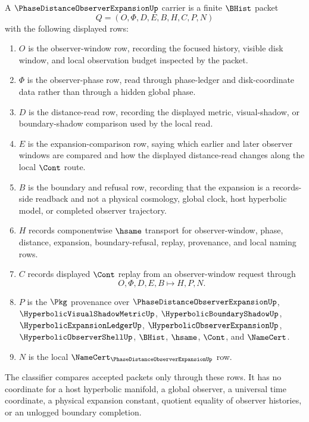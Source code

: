 \begin{definition}
\label{def:phase-distance-observer-expansion-carrier}
A $\PhaseDistanceObserverExpansionUp$ carrier is a finite $\BHist$ packet
$$
Q=(O,\Phi,D,E,B,H,C,P,N)
$$
with the following displayed rows:
\begin{enumerate}
\item $O$ is the observer-window row, recording the focused history, visible disk window, and local observation budget inspected by the packet.
\item $\Phi$ is the observer-phase row, read through phase-ledger and disk-coordinate data rather than through a hidden global phase.
\item $D$ is the distance-read row, recording the displayed metric, visual-shadow, or boundary-shadow comparison used by the local read.
\item $E$ is the expansion-comparison row, saying which earlier and later observer windows are compared and how the displayed distance-read changes along the local $\Cont$ route.
\item $B$ is the boundary and refusal row, recording that the expansion is a records-side readback and not a physical cosmology, global clock, host hyperbolic model, or completed observer trajectory.
\item $H$ records componentwise $\hsame$ transport for observer-window, phase, distance, expansion, boundary-refusal, replay, provenance, and local naming rows.
\item $C$ records displayed $\Cont$ replay from an observer-window request through
$$
O,\Phi,D,E,B \longmapsto H,P,N .
$$
\item $P$ is the $\Pkg$ provenance over $\PhaseDistanceObserverExpansionUp$, $\HyperbolicVisualShadowMetricUp$, $\HyperbolicBoundaryShadowUp$, $\HyperbolicExpansionLedgerUp$, $\HyperbolicObserverExpansionUp$, $\HyperbolicObserverShellUp$, $\BHist$, $\hsame$, $\Cont$, and $\NameCert$.
\item $N$ is the local $\NameCert_{\PhaseDistanceObserverExpansionUp}$ row.
\end{enumerate}
The classifier compares accepted packets only through these rows. It has no coordinate for a host hyperbolic manifold, a global observer, a universal time coordinate, a physical expansion constant, quotient equality of observer histories, or an unlogged boundary completion.
\end{definition}


